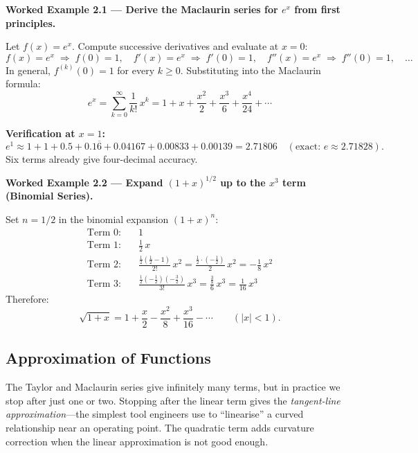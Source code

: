 \documentclass[12pt,a4paper]{article}
\begin{document}
\textbf{Worked Example 2.1 --- Derive the Maclaurin series for \(e^x\) from first principles.}

Let \(f(x) = e^x\).
Compute successive derivatives and evaluate at \(x = 0\):
\[
  f(x) = e^x \;\Rightarrow\; f(0) = 1, \quad
  f'(x) = e^x \;\Rightarrow\; f'(0) = 1, \quad
  f''(x) = e^x \;\Rightarrow\; f''(0) = 1, \quad \ldots
\]
In general, \(f^{(k)}(0) = 1\) for every \(k \geq 0\).  Substituting into the Maclaurin
formula:
\[
  e^x = \sum_{k=0}^{\infty} \frac{1}{k!}\,x^k
      = 1 + x + \frac{x^2}{2} + \frac{x^3}{6} + \frac{x^4}{24} + \cdots
\]

\textbf{Verification at \(x = 1\):}
\[
  e^1 \approx 1 + 1 + 0.5 + 0.1\overline{6} + 0.04167 + 0.00833 + 0.00139
            = 2.71806 \quad (\text{exact: } e \approx 2.71828).
\]
Six terms already give four-decimal accuracy.

\medskip
\textbf{Worked Example 2.2 --- Expand \((1+x)^{1/2}\) up to the \(x^3\) term (Binomial Series).}

Set \(n = 1/2\) in the binomial expansion \((1+x)^n\):
\begin{align*}
  \text{Term 0:}\quad & 1 \\
  \text{Term 1:}\quad & \frac{1}{2}\,x \\
  \text{Term 2:}\quad & \frac{\frac{1}{2}\!\left(\frac{1}{2}-1\right)}{2!}\,x^2
                       = \frac{\frac{1}{2}\cdot\left(-\frac{1}{2}\right)}{2}\,x^2
                       = -\frac{1}{8}\,x^2 \\
  \text{Term 3:}\quad & \frac{\frac{1}{2}\!\left(-\frac{1}{2}\right)\!\left(-\frac{3}{2}\right)}{3!}\,x^3
                       = \frac{\frac{3}{8}}{6}\,x^3
                       = \frac{1}{16}\,x^3
\end{align*}
Therefore:
\[
  \sqrt{1+x} = 1 + \frac{x}{2} - \frac{x^2}{8} + \frac{x^3}{16} - \cdots
  \qquad (|x| < 1).
\]

\subsection{Approximation of Functions}

The Taylor and Maclaurin series give infinitely many terms, but in practice we stop after
just one or two.
Stopping after the linear term gives the \emph{tangent-line approximation}---the simplest
tool engineers use to ``linearise'' a curved relationship near an operating point.
The quadratic term adds curvature correction when the linear approximation is not good enough.
\end{document}
